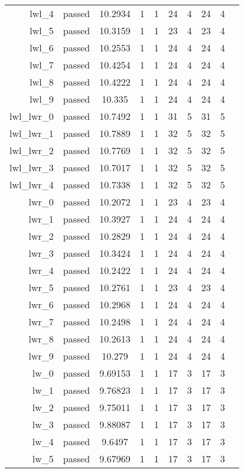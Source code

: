 \begin{longtable}{r|ccccccccc}
    lwl\_4 & passed & 10.2934 & 1 & 1 & 24 & 4 & 24 & 4 \\
    lwl\_5 & passed & 10.3159 & 1 & 1 & 23 & 4 & 23 & 4 \\
    lwl\_6 & passed & 10.2553 & 1 & 1 & 24 & 4 & 24 & 4 \\
    lwl\_7 & passed & 10.4254 & 1 & 1 & 24 & 4 & 24 & 4 \\
    lwl\_8 & passed & 10.4222 & 1 & 1 & 24 & 4 & 24 & 4 \\
    lwl\_9 & passed & 10.335 & 1 & 1 & 24 & 4 & 24 & 4 \\
    lwl\_lwr\_0 & passed & 10.7492 & 1 & 1 & 31 & 5 & 31 & 5 \\
    lwl\_lwr\_1 & passed & 10.7889 & 1 & 1 & 32 & 5 & 32 & 5 \\
    lwl\_lwr\_2 & passed & 10.7769 & 1 & 1 & 32 & 5 & 32 & 5 \\
    lwl\_lwr\_3 & passed & 10.7017 & 1 & 1 & 32 & 5 & 32 & 5 \\
    lwl\_lwr\_4 & passed & 10.7338 & 1 & 1 & 32 & 5 & 32 & 5 \\
    lwr\_0 & passed & 10.2072 & 1 & 1 & 23 & 4 & 23 & 4 \\
    lwr\_1 & passed & 10.3927 & 1 & 1 & 24 & 4 & 24 & 4 \\
    lwr\_2 & passed & 10.2829 & 1 & 1 & 24 & 4 & 24 & 4 \\
    lwr\_3 & passed & 10.3424 & 1 & 1 & 24 & 4 & 24 & 4 \\
    lwr\_4 & passed & 10.2422 & 1 & 1 & 24 & 4 & 24 & 4 \\
    lwr\_5 & passed & 10.2761 & 1 & 1 & 23 & 4 & 23 & 4 \\
    lwr\_6 & passed & 10.2968 & 1 & 1 & 24 & 4 & 24 & 4 \\
    lwr\_7 & passed & 10.2498 & 1 & 1 & 24 & 4 & 24 & 4 \\
    lwr\_8 & passed & 10.2613 & 1 & 1 & 24 & 4 & 24 & 4 \\
    lwr\_9 & passed & 10.279 & 1 & 1 & 24 & 4 & 24 & 4 \\
    lw\_0 & passed & 9.69153 & 1 & 1 & 17 & 3 & 17 & 3 \\
    lw\_1 & passed & 9.76823 & 1 & 1 & 17 & 3 & 17 & 3 \\
    lw\_2 & passed & 9.75011 & 1 & 1 & 17 & 3 & 17 & 3 \\
    lw\_3 & passed & 9.88087 & 1 & 1 & 17 & 3 & 17 & 3 \\
    lw\_4 & passed & 9.6497 & 1 & 1 & 17 & 3 & 17 & 3 \\
    lw\_5 & passed & 9.67969 & 1 & 1 & 17 & 3 & 17 & 3 \\

\end{longtable}
